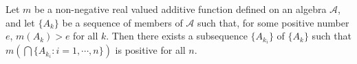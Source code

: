 Let $m$ be a non-negative real valued additive function defined on an algebra $\mathcal{A}$, and let $\{A_k\}$ be a sequence of members of $\mathcal{A}$ such that, for some positive number $e$, $m(A_k) > e$ for all $k$. Then there exists a subsequence $\{A_{k_i}\}$ of $\{A_k\}$ such that $m\left(\bigcap \{A_{k_i} : i = 1, \cdots, n\}\right)$ is positive for all $n$.
